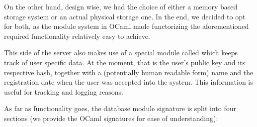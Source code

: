 On the other hand, design wise, we had the choice of either a memory based storage system or an actual physical storage one.
In the end, we decided to opt for both, as the module system in OCaml made functorizing the aforementioned required functionality relatively easy to achieve.

This side of the server also makes use of a special module called  which keeps track of user specific data.
At the moment, that is the user's public key and its respective hash, together with a (potentially human readable form) name and the registration date when the user was accepted into the system.
This information is useful for tracking and logging reasons.

As far as functionality goes, the database module signature is split into four sections (we provide the OCaml signatures for ease of understanding):
